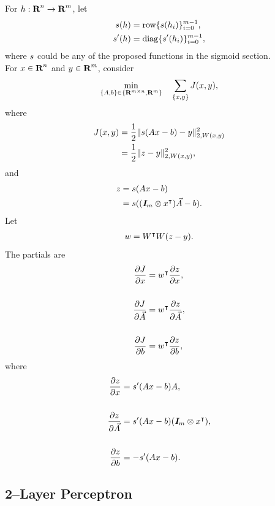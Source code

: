 \documentclass{article}
\begin{document}
    For $h:\textbf{R}^n\to\textbf{R}^m$, let
    \begin{align*}
        s(h)&=\text{row}\{s(h_i)\}_{i=0}^{m-1},\\
        s'(h)&=\text{diag}\{s'(h_i)\}_{i=0}^{m-1},
    \end{align*}
    where $s$ could be any of the proposed functions in the sigmoid section.\\
    For $x\in\textbf{R}^n$ and $y\in\textbf{R}^m$, consider
    \begin{align*}
        \min_{\{A,b\}\in\{\textbf{R}^{m\times n},\textbf{R}^m\}}\quad 
        \sum_{\{x,y\}} J (x,y),
    \end{align*}
    where
    \begin{align*}
        J(x,y)&=\frac{1}{2}\|s(Ax -b)-y \|_{2,W(x,y)}^2\\
        &=\frac{1}{2}\|z-y \|_{2,W(x,y)}^2,            
    \end{align*}
    and
    \begin{align*}
        z&=s(Ax-b)\\
        &=s((\emph{\textbf{I}}_m\otimes x ^\intercal)\vec{A}-b).
    \end{align*}
    Let
    \begin{align*}
        w=W^\intercal W(z-y ).
    \end{align*}
    The partials are
    \begin{align*}
        \frac{\partial  J }{\partial x}&=w^\intercal \frac{\partial z}{\partial x},\\\\
        \frac{\partial  J }{\partial \vec{A}}&=w^\intercal  \frac{\partial z}{\partial \vec{A}},\\\\
        \frac{\partial  J }{\partial b}&=w^\intercal \frac{\partial z}{\partial b},
    \end{align*}
    where
    \begin{align*}
        \frac{\partial z}{\partial x}&=s'(Ax-b)A,\\\\
        \frac{\partial z}{\partial \vec{A}}&=s'(Ax-b)(\emph{\textbf{I}}_m\otimes x ^\intercal),\\\\
        \frac{\partial z}{\partial b}&=-s'(Ax-b).
    \end{align*}

\subsection{2--Layer Perceptron}
\end{document}

